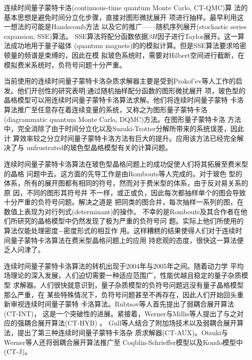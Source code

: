 连续时间量子蒙特卡洛(continuous-time quantum Monte Carlo, CT-QMC)算
法的基本思想是避免时间分立化步骤，直接对图形微扰展开
项进行抽样。最早利用这一想法的可能是Handscomb方法\cite{handscomb:1962,handscomb:1964}
以及它的推广——随机序列展开(stochastic series expansion, SSE)算法\cite{sandvik:5950}。
SSE算法将配分函数依据$\beta H$因子进行Taylor展开。这一算法成功地用于量子磁体
(quantum magnets)的的模拟计算。但是SSE算法要求哈密顿量的频谱是束缚的，因此在模
拟玻色系统时，需要对Hilbert空间进行截断，在模拟费米系统时，负符号问题十分严重。

当前使用的连续时间量子蒙特卡洛杂质求解器主要是受到Prokof'ev等人\cite{prokof:911,
beard:5130}工作的启发。他们开创性的研究表明:通过随机抽样配分函数的图形微扰展开
项，玻色型的晶格模型可以用连续时间量子蒙特卡洛算法求解。他们将连续时间量子蒙特
卡洛算法推广至任意存在着连续变量的系统，又称之为图形量子蒙特卡洛(diagrammatic
quantum Monte Carlo, DQMC)方法\cite{prokof:2514,prokof:310}。在图形量子蒙特卡洛
方法中，完全消除了由于时间分立化以及Suzuki-Trotter分解所带来的系统误差，因此计
算效率较之分立时间量子蒙特卡洛方法有巨大的提升。应用该方法已经完全解决了与
unfrustrated的玻色型晶格模型有关的计算问题。

连续时间量子蒙特卡洛算法在玻色型晶格问题上的成功促使人们将其拓展至费米型的晶格
问题中去。这方面的先导工作是由Rombouts等人\cite{rombouts:1999}完成的。对于玻色
型的体系，所有的展开图都有相同的符号，然而对于费米型的体系，由于反对易关系的原
因，不同的图形其符号并
不一样，或正或负，因此每次都抽样单个的图会导致十分严重的负符号问题。解决之道是
把同类的图合并，每次抽样一系列的图，在数值上表现为对行列式(determinant)的操作。
不幸的是Rombouts及其合作者在他们所研究的晶格模型中仍然发现了极为严重的负符号问
题。实际上他们所使用的算法\cite{rombouts:1999}仅能处理密度$-$密度形式的相互作
用。这样糟糕的结果使得人们对于连续时间量子蒙特卡洛算法在费米型晶格问题上的应用
持悲观的态度，很快这一算法便乏人问津了。

连续时间量子蒙特卡洛算法的转机出现于2004年与2005年之间\cite{gull:349}。随着动力学
平均场理论的深入发展，人们迫切需要一种适应范围广，性能优越且稳定的量子杂质模型
求解器。人们很快就意识到，量子杂质模型的负符号问题远没有量子晶格模型那么严重，在
某些特殊情况下，负符号问题甚至不再存在，因此人们开始回头重新审视连续时间量子蒙特
卡洛算法。Rubtsov等人首先提出了弱耦合展开算法(CT-INT)\cite{rubtsov:035122,assaad:035116}，
这是一个突破性的进展。紧接着，Werner与Millis等人提出了与之对应的强耦合展开算法(CT-HYB)
\cite{werner:076405,werner:155107,werner:146404,werner:2010,lauchli:235117,haule:155113}。
Gull等人结合了附加场技术以及弱耦合展开算法，提出了第三种连续时间量子蒙特卡洛杂
质求解器(CT-AUX)\cite{gull:2008}。Otsuki与Werner等人还将弱耦合展开算法推广至
Coqblin-Schrieffer模型以及Kondo模型中(CT-J)\cite{otsuki:114707}。

